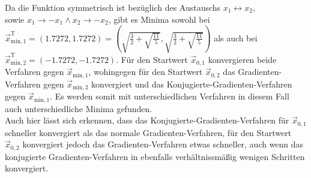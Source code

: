 Da die Funktion symmetrisch ist bezüglich des Austauschs
$x_1 \longleftrightarrow x_2$, \\ sowie
${x_1 \to -x_1 \wedge x_2 \to -x_2}$, gibt es Minima sowohl bei\\ ${\vec{x}_{\text{min},1}^{\text{T}}=(1.7272,1.7272)=\left(\sqrt{\frac{3}{2}+\sqrt{\frac{11}{5}}},\sqrt{\frac{3}{2}+\sqrt{\frac{11}{5}}}\right)}$ als auch bei \\
${\vec{x}_{\text{min},2}^{\text{T}}=(-1.7272,-1.7272)}$.
Für den Startwert $\vec{x}_{0,1}$ konvergieren beide Verfahren gegen $\vec{x}_{\text{min},1}$, wohingegen für den
Startwert $\vec{x}_{0,2}$ das Gradienten-Verfahren gegen $\vec{x}_{\text{min},2}$ konvergiert und das Konjugierte-Gradienten-Verfahren gegen $\vec{x}_{\text{min},1}$. Es werden somit mit unterschiedlichen Verfahren in diesem Fall auch unterschiedliche Minima gefunden. \\
Auch hier lässt sich erkennen, dass das Konjugierte-Gradienten-Verfahren für $\vec{x}_{0,1}$ schneller konvergiert als das normale Gradienten-Verfahren, für den Startwert $\vec{x}_{0,2}$ konvergiert jedoch das Gradienten-Verfahren etwas schneller, auch wenn das konjugierte Gradienten-Verfahren in ebenfalls verhältnissmäßig wenigen Schritten konvergiert.
